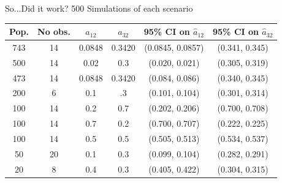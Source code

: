 \documentclass[10pt,table]{beamer}
\begin{document}
\begin{frame}{So...Did it work?}
500 Simulations of each scenario
\begin{table}
\centering
\setlength{\tabcolsep}{5pt}

\begin{tabular}{|c|c|c|c|c|c|}
\hline
Pop. & No obs. & $a_{12}$ & $a_{32}$ & 95\% CI on $\hat{a}_{12}$ & 95\% CI on $\hat{a}_{32}$  \\ \hline 
743 & 14 & 0.0848 & 0.3420 &\cellcolor{green!25}(0.0845, 0.0857) & \cellcolor{green!25}(0.341, 0.345) \\ \hline
500 & 14 & 0.02 &0.3 & \cellcolor{red!25} (0.020, 0.021) &\cellcolor{red!25}  (0.305, 0.319)\\ \hline
473 & 14 & 0.0848 & 0.3420 &\cellcolor{green!25} (0.084, 0.086) & \cellcolor{green!25}(0.340, 0.345) \\ \hline
200 & 6 & 0.1 &.3 &\cellcolor{red!25} (0.101, 0.104)&\cellcolor{red!25}  (0.301, 0.314)\\ \hline 
100 & 14 & 0.2 & 0.7 &\cellcolor{red!25} (0.202, 0.206) & \cellcolor{green!25}(0.700, 0.708) \\ \hline
100 & 14 & 0.7 & 0.2 &\cellcolor{green!25}(0.700, 0.707) & \cellcolor{red!25} (0.222, 0.225)\\ \hline
100 & 14 &0.5 &0.5 &\cellcolor{red!25} (0.505, 0.513) &\cellcolor{red!25} (0.534, 0.537)\\ \hline

50 & 20 & 0.1 &0.3 &\cellcolor{green!25}(0.099, 0.104) & \cellcolor{red!25} (0.282, 0.291)\\ \hline

20 & 8 & 0.4 & 0.3 & \cellcolor{red!25} (0.405, 0.422) & \cellcolor{red!25} (0.304, 0.315)\\ \hline



\end{tabular}
\label{tab1}
\end{table}

\end{frame}
\end{document}
